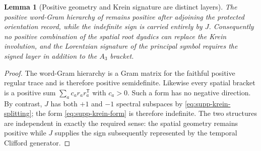 \documentclass[11pt]{article}
\numberwithin{equation}{section}
\newtheorem{lemma}[lemma]{Lemma}
\theoremstyle{definition}
\theoremstyle{remark}
\begin{document}
\begin{lemma}[Positive geometry and Krein signature are distinct layers]
\label{lem:supp-positive-krein-distinct}
The positive word-Gram hierarchy of  remains positive after adjoining the protected orientation record, while the indefinite sign is carried entirely by $J$.  Consequently no positive combination of the spatial root dyadics can replace the Krein involution, and the Lorentzian signature of the principal symbol requires the signed layer in addition to the $A_3$ bracket.
\end{lemma}

\begin{proof}
The word-Gram hierarchy is a Gram matrix for the faithful positive regular trace and is therefore positive semidefinite.  Likewise every spatial bracket is a positive sum $\sum_a c_a r_ar_a^{\mathsf T}$ with $c_a>0$.  Such a form has no negative direction.  By contrast, $J$ has both $+1$ and $-1$ spectral subspaces by \eqref{eq:supp-krein-splitting}; the form \eqref{eq:supp-krein-form} is therefore indefinite.  The two structures are independent in exactly the required sense: the spatial geometry remains positive while $J$ supplies the sign subsequently represented by the temporal Clifford generator.
\end{proof}
\end{document}
